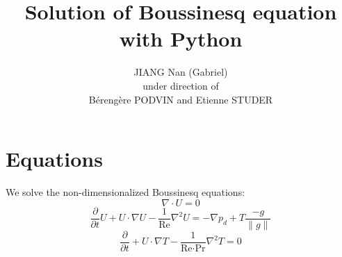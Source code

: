 \documentclass{article}
\title{Solution of Boussinesq equation with Python}
\author{JIANG Nan (Gabriel) \\ under direction of \\ Bérengère PODVIN and Etienne STUDER}
\begin{document}
\maketitle

\section{Equations}
We solve the non-dimensionalized Boussinesq equations:
\begin{equation}
\nabla \cdot U = 0
\end{equation}
\begin{equation}
\frac{\partial}{\partial t} U + U \cdot \nabla U 
- \frac{1}{\text{Re}} \nabla^2 U
= - \nabla p_d + T \frac{-g}{\|g\|}
\end{equation}
\begin{equation}
\frac{\partial}{\partial t} + U \cdot \nabla T
- \frac{1}{\text{Re} \cdot \text{Pr}} \nabla^2 T = 0
\end{equation}




%
%
\end{document}
